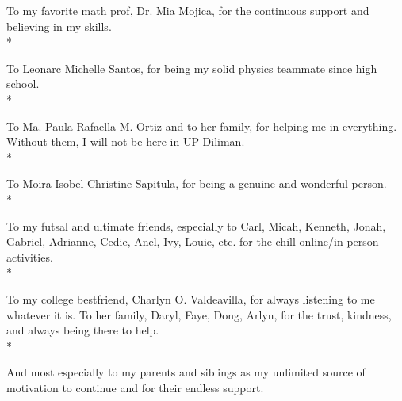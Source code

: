 To my favorite math prof, Dr. Mia Mojica, for the continuous support and believing in my skills.
\\*

To Leonarc Michelle Santos, for being my solid physics teammate since high school.
\\*

To Ma. Paula Rafaella M. Ortiz and to her family, for helping me in everything. Without them, I will not be here in UP Diliman.  
\\*

To Moira Isobel Christine Sapitula, for being a genuine and wonderful person.
\\*

To my futsal and ultimate friends, especially to Carl, Micah, Kenneth, Jonah, Gabriel, Adrianne, Cedie, Anel, Ivy, Louie, etc. for the chill online/in-person activities.
\\*

To my college bestfriend, Charlyn O. Valdeavilla, for always listening to me whatever it is. To her family, Daryl, Faye, Dong, Arlyn, for the trust, kindness, and always being there to help. 
\\*

And most especially to my parents and siblings as my unlimited source of motivation to continue and for their endless support. 


